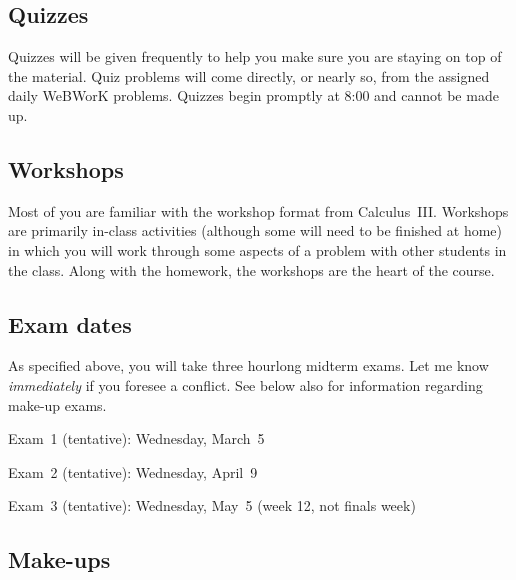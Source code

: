 \documentclass[symmetric]{tufte-handout}
\begin{document}
\subsection{Quizzes}

Quizzes%
will be given frequently to help you make sure you are staying on top
of the material. Quiz problems will come directly, or nearly so, from the
assigned daily WeBWorK problems. Quizzes begin promptly at 8:00 and cannot be
made up.

\subsection{Workshops}

Most of you are familiar with the workshop format%
from Calculus~III. Workshops
are primarily in-class activities (although some will need to be finished at home)
in which you will work through some aspects of a problem with other students in
the class. Along with the homework, the workshops are the heart of the course.

\subsection{Exam dates}

As specified above, you will take three hourlong midterm exams. Let me know
\emph{immediately} if you foresee a conflict. See below also for information
regarding make-up exams.

\begin{compactitem}
   \item Exam~1 (tentative): Wednesday, March~5
   \item Exam~2 (tentative): Wednesday, April~9
   \item Exam~3 (tentative): Wednesday, May~5 (week 12, not finals week)%
\end{compactitem}
%
\subsection{Make-ups}
\end{document}
